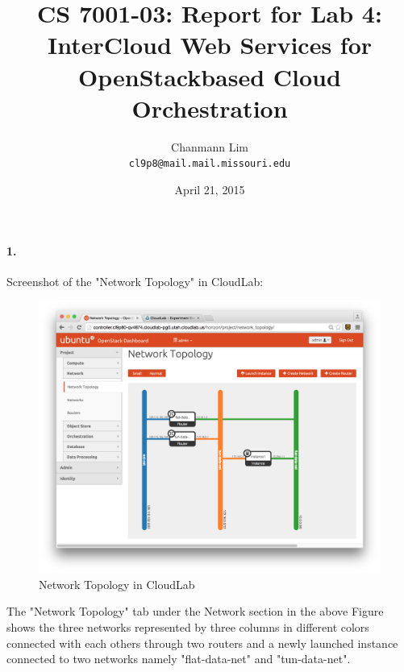 \documentclass[a4paper]{article}
\begin{document}
\title{CS 7001-03: Report for Lab 4: InterCloud Web Services for OpenStack\-based Cloud Orchestration}
\author{Chanmann Lim\\ 
	\texttt{cl9p8@mail.mail.missouri.edu}}
\date{April 21, 2015}
\maketitle

\paragraph{1. } Screenshot of the "Network Topology" in CloudLab: \\
\begin{figure}[H]
  \centering
    \includegraphics[scale=.37]{net_topo.png}
  \caption{Network Topology in CloudLab}
\end{figure}

The "Network Topology" tab under the Network section in the above Figure shows the three networks represented by three columns in different colors connected with each others through two routers and a newly launched instance connected to two networks namely "flat-data-net" and "tun-data-net". 

\end{document}
